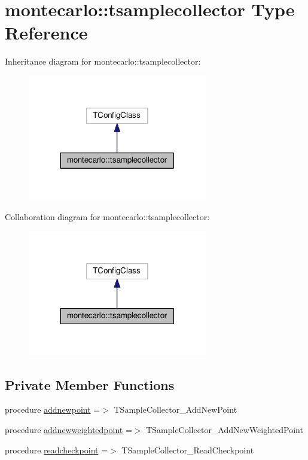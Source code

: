 \hypertarget{structmontecarlo_1_1tsamplecollector}{}\section{montecarlo\+:\+:tsamplecollector Type Reference}
\label{structmontecarlo_1_1tsamplecollector}


Inheritance diagram for montecarlo\+:\+:tsamplecollector\+:
\nopagebreak
\begin{figure}[H]
\begin{center}
\leavevmode
\includegraphics[width=222pt]{structmontecarlo_1_1tsamplecollector__inherit__graph}
\end{center}
\end{figure}


Collaboration diagram for montecarlo\+:\+:tsamplecollector\+:
\nopagebreak
\begin{figure}[H]
\begin{center}
\leavevmode
\includegraphics[width=222pt]{structmontecarlo_1_1tsamplecollector__coll__graph}
\end{center}
\end{figure}
\subsection*{Private Member Functions}
\begin{DoxyCompactItemize}
\item 
procedure \mbox{\hyperlink{structmontecarlo_1_1tsamplecollector_a497d033a0d0e0cdf0af7efb536f4632d}{addnewpoint}} =$>$ T\+Sample\+Collector\+\_\+\+Add\+New\+Point
\item 
procedure \mbox{\hyperlink{structmontecarlo_1_1tsamplecollector_aadbe71aee67bf84642513335af8facc5}{addnewweightedpoint}} =$>$ T\+Sample\+Collector\+\_\+\+Add\+New\+Weighted\+Point
\item 
procedure \mbox{\hyperlink{structmontecarlo_1_1tsamplecollector_a7ecc8abd8277ce35862d40c8a5db4d18}{readcheckpoint}} =$>$ T\+Sample\+Collector\+\_\+\+Read\+Checkpoint
\end{DoxyCompactItemize}


